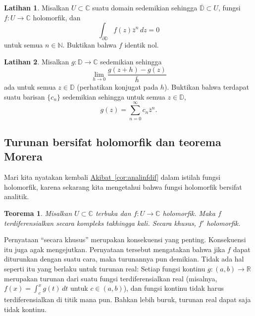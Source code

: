\documentclass[12pt,openany]{book}
\newcommand{\C}{{\mathbb{C}}}
\newcommand{\R}{{\mathbb{R}}}
\newcommand{\N}{{\mathbb{N}}}
\newcommand{\D}{{\mathbb{D}}}
\newcommand{\myquote}[1]{``#1''}
\theoremstyle{plain}
\newtheorem{thm}{Teorema}[section]
\theoremstyle{remark}
\theoremstyle{definition}
\newenvironment{exbox}{%
    \def\FrameCommand{\vrule width 1pt \relax\hspace{10pt}}%
    \MakeFramed{\advance\hsize-\width\FrameRestore}%
}{%
    \endMakeFramed
}
\theoremstyle{exercise}
\newtheorem{exercise}{Latihan}[section]
\theoremstyle{example}
\newcommand{\corref}[1]{\hyperref[#1]{Akibat~\ref*{#1}}}
\begin{document}
\begin{exbox}
\begin{exercise}
Misalkan $U \subset \C$ suatu domain sedemikian sehingga $\overline{\D} \subset U$,
fungsi $f \colon U \to \C$ holomorfik, dan
\begin{equation*}
\int_{\partial \D} f(z) \bar{z}^n \, dz = 0
\end{equation*}
untuk semua $n \in \N$.  Buktikan bahwa $f$ identik nol.
\end{exercise}

\begin{exercise}
Misalkan $g \colon \D \to \C$ sedemikian sehingga
\begin{equation*}
\lim_{h \to 0}
\frac{g(z+h)-g(z)}{\bar{h}}
\end{equation*}
ada untuk semua $z \in \D$ (perhatikan konjugat pada $h$).
Buktikan bahwa terdapat
suatu barisan $\{ c_n \}$ sedemikian sehingga untuk semua $z \in \D$,
\begin{equation*}
g(z) = \sum_{n=0}^\infty c_n \bar{z}^n .
\end{equation*}
\end{exercise}
\end{exbox}

\subsection{Turunan bersifat holomorfik dan teorema Morera}

Mari kita nyatakan kembali \corref{cor:analinfdif} dalam istilah
fungsi holomorfik, karena sekarang kita mengetahui bahwa fungsi holomorfik
bersifat analitik.

\begin{thm} \label{thm:holfuncinfder}
Misalkan $U \subset \C$ terbuka dan $f \colon U \to \C$ holomorfik.  Maka
$f$ terdiferensialkan secara kompleks takhingga kali.  Secara khusus, $f'$
holomorfik.
\end{thm}

Pernyataan \myquote{secara khusus} merupakan konsekuensi yang penting.  Konsekuensi itu juga agak
mengejutkan.
Pernyataan tersebut mengatakan bahwa jika $f$ dapat diturunkan dengan suatu cara,
maka turunannya pun demikian.  Tidak ada hal seperti itu yang berlaku untuk turunan
real:
Setiap fungsi kontinu $g \colon (a,b) \to \R$ merupakan turunan
dari suatu fungsi terdiferensialkan real (misalnya, $f(x) = \int_c^x g(t)\,dt$ untuk $c
\in (a,b)$),
dan fungsi kontinu tidak harus terdiferensialkan di titik mana pun.
Bahkan lebih buruk, turunan real dapat saja tidak kontinu.
\end{document}

